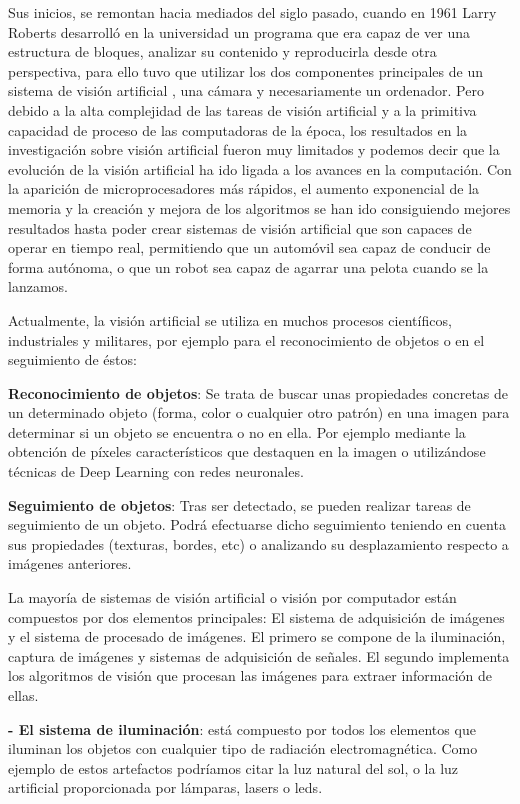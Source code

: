 Sus inicios, se remontan hacia mediados del siglo pasado, cuando en 1961 Larry Roberts desarrolló en la universidad un programa que era capaz de ver una estructura de bloques, analizar su contenido y reproducirla desde otra perspectiva, para ello tuvo que utilizar los dos componentes principales de un sistema de visión artificial , una cámara y necesariamente un ordenador. Pero debido a la alta complejidad de las tareas de visión artificial y a la primitiva capacidad de proceso  de las computadoras de la época, los resultados en la investigación sobre visión artificial fueron muy limitados y podemos decir que la evolución de la visión artificial ha ido ligada a los avances en la computación. Con la aparición de microprocesadores más rápidos, el aumento exponencial de la memoria y la creación y mejora de los algoritmos  se han ido consiguiendo mejores resultados hasta poder crear sistemas de visión artificial que son capaces de operar en tiempo real, permitiendo que un automóvil sea capaz de conducir de forma autónoma, o que un robot sea capaz de agarrar una pelota cuando se la lanzamos.

Actualmente, la visión artificial se utiliza en muchos procesos científicos, industriales y militares, por ejemplo para el reconocimiento de objetos o en el seguimiento de éstos:

	\textbf{Reconocimiento de objetos}: Se trata de buscar unas propiedades concretas de un determinado objeto (forma, color o cualquier otro patrón) en una imagen para determinar si un objeto se encuentra o no en ella. Por ejemplo mediante la obtención de píxeles característicos que destaquen en la imagen o utilizándose técnicas de Deep Learning con redes neuronales.

	\textbf{Seguimiento de objetos}: Tras ser detectado, se pueden realizar tareas de seguimiento de un objeto. Podrá efectuarse dicho seguimiento teniendo en cuenta sus propiedades (texturas, bordes, etc) o analizando su desplazamiento respecto a imágenes anteriores.


La mayoría de sistemas de visión artificial o visión por computador están compuestos por dos elementos principales:  El sistema de adquisición de imágenes y el sistema de procesado de imágenes. El primero se compone de la iluminación, captura de imágenes y sistemas de adquisición de señales. El segundo implementa los algoritmos de visión que procesan las imágenes para extraer información de ellas.

	\textbf{- El sistema de iluminación}: está compuesto por todos los elementos que iluminan los objetos con cualquier tipo de radiación electromagnética. Como ejemplo de estos artefactos podríamos citar la luz natural del sol, o la luz artificial proporcionada por lámparas, lasers o leds.

